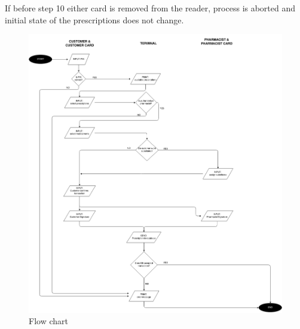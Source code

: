  If before step 10 either card is removed from the reader, process is aborted and initial state of the prescriptions does not change.

\begin{figure}
    \centering
    \hspace*{-1.2in}
    \includegraphics[width=0.98\textheight]{flow-chart.png}
    \caption{Flow chart}
    \label{fig:flowchart}
\end{figure} 

